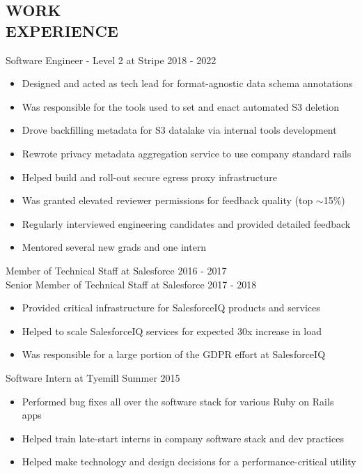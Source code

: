 \documentclass[line,margin]{res}
\begin{document}
\begin{resume}
\section{\textcolor{HeaderColor}{WORK \\ EXPERIENCE}}
	      {\sc Software Engineer - Level 2 at Stripe} \hfill 2018 - 2022
                 \begin{itemize}  \itemsep -2pt %
                 \item Designed and acted as tech lead for format-agnostic data schema annotations
                 \item Was responsible for the tools used to set and enact automated S3 deletion
                 \item Drove backfilling metadata for S3 datalake via internal tools development
	             \item Rewrote privacy metadata aggregation service to use company standard rails
                 \item Helped build and roll-out secure egress proxy infrastructure
                 \item Was granted elevated reviewer permissions for feedback quality (top $\sim$15\%)
                 \item Regularly interviewed engineering candidates and provided detailed feedback
                 \item Mentored several new grads and one intern
                 \end{itemize}

	      {\sc Member of Technical Staff at Salesforce} \hfill 2016 - 2017 \\
	      {\sc Senior Member of Technical Staff at Salesforce} \hfill 2017 - 2018
                 \begin{itemize}  \itemsep -2pt %
	             \item Provided critical infrastructure for SalesforceIQ products and services
                 \item Helped to scale SalesforceIQ services for expected 30x increase in load
                 \item Was responsible for a large portion of the GDPR effort at SalesforceIQ
                 \end{itemize}

                {\sc Software Intern at Tyemill} \hfill Summer 2015
                 \begin{itemize}  \itemsep -2pt %
                 \item Performed bug fixes all over the software stack for various Ruby on Rails apps
	      \item Helped train late-start interns in company software stack and dev practices
	      \item Helped make technology and design decisions for a performance-critical utility
                 \end{itemize}


\end{resume}
\end{document}

